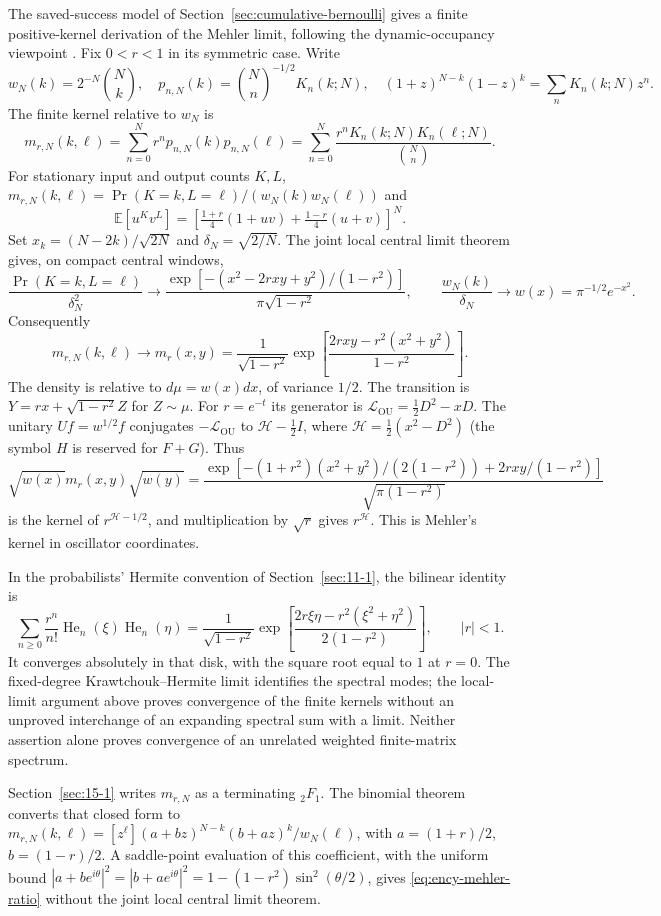 The saved-success model of Section~\ref{sec:cumulative-bernoulli}
gives a finite positive-kernel derivation of the Mehler limit,
following the dynamic-occupancy viewpoint
\cite{CooperHoareRahman1977,HoareRahman1984}. Fix $0<r<1$ in its
symmetric case. Write
\[
w_N(k)=2^{-N}\binom Nk,\quad
p_{n,N}(k)=\binom Nn^{-1/2}K_n(k;N),\quad
(1+z)^{N-k}(1-z)^k=\sum_nK_n(k;N)z^n.
\]
The finite kernel relative to $w_N$ is
\begin{equation}\label{eq:ency-finite-mehler}
m_{r,N}(k,\ell)=\sum_{n=0}^Nr^np_{n,N}(k)p_{n,N}(\ell)
=\sum_{n=0}^N\frac{r^nK_n(k;N)K_n(\ell;N)}{\binom Nn}.
\end{equation}
For stationary input and output counts $K,L$,
$m_{r,N}(k,\ell)=\Pr(K=k,L=\ell)/(w_N(k)w_N(\ell))$ and
\[
\mathbb E[u^Kv^L]=
\left[\tfrac{1+r}{4}(1+uv)+\tfrac{1-r}{4}(u+v)\right]^N.
\]
Set $x_k=(N-2k)/\sqrt{2N}$ and $\delta_N=\sqrt{2/N}$.
The joint local central limit theorem gives, on compact central windows,
\[
\frac{\Pr(K=k,L=\ell)}{\delta_N^2}\longrightarrow
\frac{\exp[-(x^2-2rxy+y^2)/(1-r^2)]}{\pi\sqrt{1-r^2}},
\qquad \frac{w_N(k)}{\delta_N}\longrightarrow
w(x)=\pi^{-1/2}e^{-x^2}.
\]
Consequently
\begin{equation}\label{eq:ency-mehler-ratio}
m_{r,N}(k,\ell)\longrightarrow m_r(x,y)
=\frac1{\sqrt{1-r^2}}
\exp\left[\frac{2rxy-r^2(x^2+y^2)}{1-r^2}\right].
\end{equation}
The density is relative to $d\mu=w(x)dx$, of variance $1/2$.
The transition is $Y=rx+\sqrt{1-r^2}Z$ for $Z\sim\mu$.
For $r=e^{-t}$ its generator is $\mathcal L_{\mathrm{OU}}=\frac12D^2-xD$.
The unitary $Uf=w^{1/2}f$ conjugates $-\mathcal L_{\mathrm{OU}}$ to
$\mathcal H-\frac12I$, where $\mathcal H=\frac12(x^2-D^2)$ (the symbol $H$ is reserved for $F+G$). Thus
\[
\sqrt{w(x)}m_r(x,y)\sqrt{w(y)}
=\frac{\exp[-(1+r^2)(x^2+y^2)/(2(1-r^2))+2rxy/(1-r^2)]}
{\sqrt{\pi(1-r^2)}}
\]
is the kernel of $r^{\mathcal H-1/2}$, and multiplication by $\sqrt r$ gives
$r^{\mathcal H}$. This is Mehler's kernel in oscillator coordinates.

In the probabilists' Hermite convention of Section~\ref{sec:11-1},
the bilinear identity is
\[
\sum_{n\ge0}\frac{r^n}{n!}\operatorname{He}_n(\xi)
\operatorname{He}_n(\eta)
=\frac1{\sqrt{1-r^2}}
\exp\left[\frac{2r\xi\eta-r^2(\xi^2+\eta^2)}{2(1-r^2)}\right],
\qquad |r|<1.
\]
It converges absolutely in that disk, with the square root equal to
$1$ at $r=0$. The fixed-degree Krawtchouk--Hermite limit identifies the
spectral modes; the local-limit argument above proves convergence of
the finite kernels without an unproved interchange of an expanding
spectral sum with a limit. Neither assertion alone proves convergence
of an unrelated weighted finite-matrix spectrum.

\begin{remark}
Section~\ref{sec:15-1} writes $m_{r,N}$ as a terminating ${}_2F_1$.
The binomial theorem converts that closed form to
$m_{r,N}(k,\ell)=[z^\ell](a+bz)^{N-k}(b+az)^k/w_N(\ell)$, with
$a=(1+r)/2$, $b=(1-r)/2$. A saddle-point evaluation of this coefficient,
with the uniform bound
$|a+be^{i\theta}|^2=|b+ae^{i\theta}|^2=1-(1-r^2)\sin^2(\theta/2)$,
gives \eqref{eq:ency-mehler-ratio} without the joint local central limit
theorem.
\end{remark}
